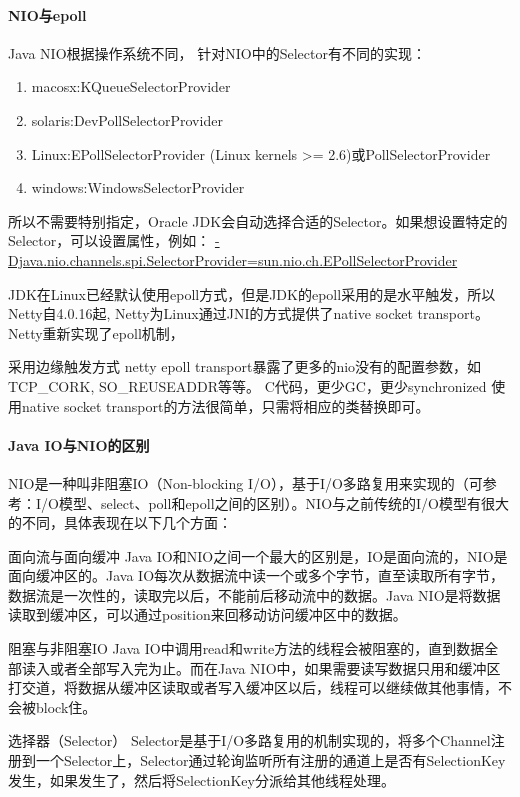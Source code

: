 \documentclass[../../../interview-questions.tex]{subfiles}
\begin{document}
\paragraph{NIO与epoll}

Java NIO根据操作系统不同， 针对NIO中的Selector有不同的实现：

\begin{enumerate}
\item{macosx:KQueueSelectorProvider}
\item{solaris:DevPollSelectorProvider}
\item{Linux:EPollSelectorProvider (Linux kernels >= 2.6)或PollSelectorProvider}
\item{windows:WindowsSelectorProvider}
\end{enumerate}
所以不需要特别指定，Oracle JDK会自动选择合适的Selector。如果想设置特定的Selector，可以设置属性，例如：
\url{-Djava.nio.channels.spi.SelectorProvider=sun.nio.ch.EPollSelectorProvider}

JDK在Linux已经默认使用epoll方式，但是JDK的epoll采用的是水平触发，所以Netty自4.0.16起, Netty为Linux通过JNI的方式提供了native socket transport。Netty重新实现了epoll机制，

采用边缘触发方式
netty epoll transport暴露了更多的nio没有的配置参数，如 TCP\_CORK, SO\_REUSEADDR等等。
C代码，更少GC，更少synchronized
使用native socket transport的方法很简单，只需将相应的类替换即可。


\paragraph{Java IO与NIO的区别}

NIO是一种叫非阻塞IO（Non-blocking I/O），基于I/O多路复用来实现的（可参考：I/O模型、select、poll和epoll之间的区别）。NIO与之前传统的I/O模型有很大的不同，具体表现在以下几个方面：

面向流与面向缓冲
Java IO和NIO之间一个最大的区别是，IO是面向流的，NIO是面向缓冲区的。Java IO每次从数据流中读一个或多个字节，直至读取所有字节，数据流是一次性的，读取完以后，不能前后移动流中的数据。Java NIO是将数据读取到缓冲区，可以通过position来回移动访问缓冲区中的数据。

阻塞与非阻塞IO
Java IO中调用read和write方法的线程会被阻塞的，直到数据全部读入或者全部写入完为止。而在Java NIO中，如果需要读写数据只用和缓冲区打交道，将数据从缓冲区读取或者写入缓冲区以后，线程可以继续做其他事情，不会被block住。

选择器（Selector）
Selector是基于I/O多路复用的机制实现的，将多个Channel注册到一个Selector上，Selector通过轮询监听所有注册的通道上是否有SelectionKey发生，如果发生了，然后将SelectionKey分派给其他线程处理。
\end{document}
